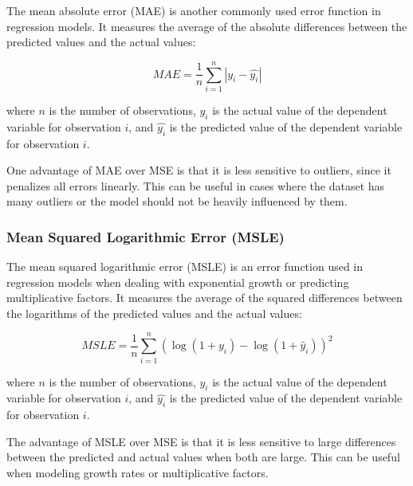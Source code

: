 \documentclass{article}
\begin{document}
The mean absolute error (MAE) is another commonly used error function in regression models. It measures the average of the absolute differences between the predicted values and the actual values:

\begin{equation}
MAE = \frac{1}{n}\sum_{i=1}^{n}|y_i - \hat{y_i}|
\end{equation}

where $n$ is the number of observations, $y_i$ is the actual value of the dependent variable for observation $i$, and $\hat{y_i}$ is the predicted value of the dependent variable for observation $i$.

One advantage of MAE over MSE is that it is less sensitive to outliers, since it penalizes all errors linearly. This can be useful in cases where the dataset has many outliers or the model should not be heavily influenced by them.

\subsubsection{Mean Squared Logarithmic Error (MSLE)}

\begin{center}
\end{center}

The mean squared logarithmic error (MSLE) is an error function used in regression models when dealing with exponential growth or predicting multiplicative factors. It measures the average of the squared differences between the logarithms of the predicted values and the actual values:

\begin{equation}
MSLE = \frac{1}{n}\sum_{i=1}^{n}(\log(1 + y_i) - \log(1 + \hat{y}_i))^2
\end{equation}

where $n$ is the number of observations, $y_i$ is the actual value of the dependent variable for observation $i$, and $\hat{y_i}$ is the predicted value of the dependent variable for observation $i$.

The advantage of MSLE over MSE is that it is less sensitive to large differences between the predicted and actual values when both are large. This can be useful when modeling growth rates or multiplicative factors.
\end{document}

